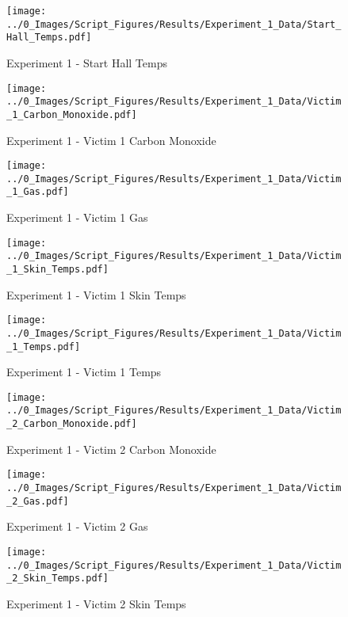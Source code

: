 	\begin{figure}[H]
		\centering
		\texttt{[image: ../0\_Images/Script\_Figures/Results/Experiment\_1\_Data/Start\_Hall\_Temps.pdf]}
		\caption[]{Experiment 1 - Start Hall Temps}
	\end{figure}
 
	\clearpage

	\begin{figure}[H]
		\centering
		\texttt{[image: ../0\_Images/Script\_Figures/Results/Experiment\_1\_Data/Victim\_1\_Carbon\_Monoxide.pdf]}
		\caption[]{Experiment 1 - Victim 1 Carbon Monoxide}
	\end{figure}
 

	\begin{figure}[H]
		\centering
		\texttt{[image: ../0\_Images/Script\_Figures/Results/Experiment\_1\_Data/Victim\_1\_Gas.pdf]}
		\caption[]{Experiment 1 - Victim 1 Gas}
	\end{figure}
 
	\clearpage

	\begin{figure}[H]
		\centering
		\texttt{[image: ../0\_Images/Script\_Figures/Results/Experiment\_1\_Data/Victim\_1\_Skin\_Temps.pdf]}
		\caption[]{Experiment 1 - Victim 1 Skin Temps}
	\end{figure}
 

	\begin{figure}[H]
		\centering
		\texttt{[image: ../0\_Images/Script\_Figures/Results/Experiment\_1\_Data/Victim\_1\_Temps.pdf]}
		\caption[]{Experiment 1 - Victim 1 Temps}
	\end{figure}
 
	\clearpage

	\begin{figure}[H]
		\centering
		\texttt{[image: ../0\_Images/Script\_Figures/Results/Experiment\_1\_Data/Victim\_2\_Carbon\_Monoxide.pdf]}
		\caption[]{Experiment 1 - Victim 2 Carbon Monoxide}
	\end{figure}
 

	\begin{figure}[H]
		\centering
		\texttt{[image: ../0\_Images/Script\_Figures/Results/Experiment\_1\_Data/Victim\_2\_Gas.pdf]}
		\caption[]{Experiment 1 - Victim 2 Gas}
	\end{figure}
 
	\clearpage

	\begin{figure}[H]
		\centering
		\texttt{[image: ../0\_Images/Script\_Figures/Results/Experiment\_1\_Data/Victim\_2\_Skin\_Temps.pdf]}
		\caption[]{Experiment 1 - Victim 2 Skin Temps}
	\end{figure}
 

